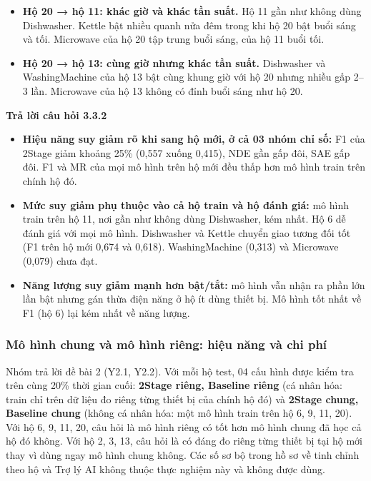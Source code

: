 \begin{itemize}
\item \textbf{Hộ 20 → hộ 11: khác giờ và khác tần suất.} Hộ 11 gần như không dùng Dishwasher. Kettle bật nhiều quanh nửa đêm trong khi hộ 20 bật buổi sáng và tối. Microwave của hộ 20 tập trung buổi sáng, của hộ 11 buổi tối.
\item \textbf{Hộ 20 → hộ 13: cùng giờ nhưng khác tần suất.} Dishwasher và WashingMachine của hộ 13 bật cùng khung giờ với hộ 20 nhưng nhiều gấp 2–3 lần. Microwave của hộ 13 không có đỉnh buổi sáng như hộ 20.
\end{itemize}

\medskip\noindent\textbf{Trả lời câu hỏi 3.3.2}\par\nopagebreak

\begin{itemize}
\item \textbf{Hiệu năng suy giảm rõ khi sang hộ mới, ở cả 03 nhóm chỉ số:} F1 của 2Stage giảm khoảng 25\% (0,557 xuống 0,415), NDE gần gấp đôi, SAE gấp đôi. F1 và MR của mọi mô hình trên hộ mới đều thấp hơn mô hình train trên chính hộ đó.
\item \textbf{Mức suy giảm phụ thuộc vào cả hộ train và hộ đánh giá:} mô hình train trên hộ 11, nơi gần như không dùng Dishwasher, kém nhất. Hộ 6 dễ đánh giá với mọi mô hình. Dishwasher và Kettle chuyển giao tương đối tốt (F1 trên hộ mới 0,674 và 0,618). WashingMachine (0,313) và Microwave (0,079) chưa đạt.
\item \textbf{Năng lượng suy giảm mạnh hơn bật/tắt:} mô hình vẫn nhận ra phần lớn lần bật nhưng gán thừa điện năng ở hộ ít dùng thiết bị. Mô hình tốt nhất về F1 (hộ 6) lại kém nhất về năng lượng.
\end{itemize}

\subsubsection{Mô hình chung và mô hình riêng: hiệu năng và chi phí}

Nhóm trả lời đề bài 2 (Y2.1, Y2.2). Với mỗi hộ test, 04 cấu hình được kiểm tra trên cùng 20\% thời gian cuối: \textbf{2Stage riêng, Baseline riêng} (cá nhân hóa: train chỉ trên dữ liệu đo riêng từng thiết bị của chính hộ đó) và \textbf{2Stage chung, Baseline chung} (không cá nhân hóa: một mô hình train trên hộ 6, 9, 11, 20). Với hộ 6, 9, 11, 20, câu hỏi là mô hình riêng có tốt hơn mô hình chung đã học cả hộ đó không. Với hộ 2, 3, 13, câu hỏi là có đáng đo riêng từng thiết bị tại hộ mới thay vì dùng ngay mô hình chung không. Các số sơ bộ trong hồ sơ về tinh chỉnh theo hộ và Trợ lý AI không thuộc thực nghiệm này và không được dùng.

